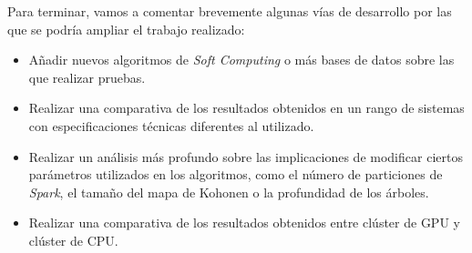 Para terminar, vamos a comentar brevemente algunas vías de desarrollo por las que se podría ampliar el trabajo realizado: \\
\begin{itemize}
	\item Añadir nuevos algoritmos de \textit{Soft Computing} o más bases de datos sobre las que realizar pruebas.\\
	\item Realizar una comparativa de los resultados obtenidos en un rango de sistemas con especificaciones técnicas diferentes al utilizado.\\
	\item Realizar un análisis más profundo sobre las implicaciones de modificar ciertos parámetros utilizados en los algoritmos, como el número de particiones de \textit{Spark}, el tamaño del mapa de Kohonen o la profundidad de los árboles.\\
	\item Realizar una comparativa de los resultados obtenidos entre clúster de GPU y clúster de CPU.\\
\end{itemize} 
